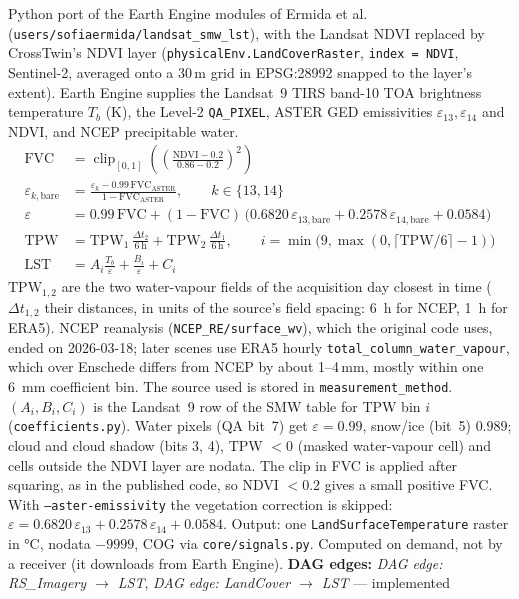 \documentclass[11pt]{article}
\newcommand{\code}[1]{\texttt{#1}}
\newcommand{\dagedge}[1]{\textit{DAG edge: #1}}
\newcommand{\statusdone}{\textcolor{green!50!black}{implemented}}
\begin{document}
Python port of the Earth Engine modules of Ermida et al.\ \cite{Ermida2020SMW} (\texttt{users/sofiaermida/landsat\_smw\_lst}), with the Landsat NDVI replaced by CrossTwin's NDVI layer (\code{physicalEnv.LandCoverRaster}, \code{index = NDVI}, Sentinel-2, averaged onto a 30\,m grid in EPSG:28992 snapped to the layer's extent). Earth Engine supplies the Landsat~9 TIRS band-10 TOA brightness temperature $T_b$ (\si{K}), the Level-2 \texttt{QA\_PIXEL}, ASTER GED emissivities $\varepsilon_{13}, \varepsilon_{14}$ and NDVI, and NCEP precipitable water.
\begin{align}
  \mathrm{FVC} &= \operatorname{clip}_{[0,1]}\!\left(\left(\frac{\mathrm{NDVI} - 0.2}{0.86 - 0.2}\right)^{2}\right) \\
  \varepsilon_{k,\text{bare}} &= \frac{\varepsilon_{k} - 0.99\,\mathrm{FVC}_{\text{ASTER}}}{1 - \mathrm{FVC}_{\text{ASTER}}}, \qquad k \in \{13, 14\} \\
  \varepsilon &= 0.99\,\mathrm{FVC} + (1 - \mathrm{FVC})\,\big(0.6820\,\varepsilon_{13,\text{bare}} + 0.2578\,\varepsilon_{14,\text{bare}} + 0.0584\big) \\
  \mathrm{TPW} &= \mathrm{TPW}_1\,\frac{\Delta t_2}{6\,\mathrm{h}} + \mathrm{TPW}_2\,\frac{\Delta t_1}{6\,\mathrm{h}}, \qquad i = \min\!\big(9, \max(0, \lceil \mathrm{TPW}/6 \rceil - 1)\big) \\
  \mathrm{LST} &= A_i \frac{T_b}{\varepsilon} + \frac{B_i}{\varepsilon} + C_i
\end{align}
$\mathrm{TPW}_{1,2}$ are the two water-vapour fields of the acquisition day closest in time ($\Delta t_{1,2}$ their distances, in units of the source's field spacing: \SI{6}{h} for NCEP, \SI{1}{h} for ERA5). NCEP reanalysis (\texttt{NCEP\_RE/surface\_wv}), which the original code uses, ended on 2026-03-18; later scenes use ERA5 hourly \texttt{total\_column\_water\_vapour}, which over Enschede differs from NCEP by about 1--4\,mm, mostly within one \SI{6}{mm} coefficient bin. The source used is stored in \code{measurement\_method}. $(A_i, B_i, C_i)$ is the Landsat~9 row of the SMW table for TPW bin $i$ (\code{coefficients.py}). Water pixels (QA bit~7) get $\varepsilon = 0.99$, snow/ice (bit~5) $0.989$; cloud and cloud shadow (bits 3, 4), TPW $<0$ (masked water-vapour cell) and cells outside the NDVI layer are nodata. The clip in FVC is applied after squaring, as in the published code, so NDVI $<0.2$ gives a small positive FVC. With \code{--aster-emissivity} the vegetation correction is skipped: $\varepsilon = 0.6820\,\varepsilon_{13} + 0.2578\,\varepsilon_{14} + 0.0584$. Output: one \code{LandSurfaceTemperature} raster in \si{\celsius}, nodata $-9999$, COG via \code{core/signals.py}. Computed on demand, not by a receiver (it downloads from Earth Engine). \textbf{DAG edges:} \dagedge{RS\_Imagery $\rightarrow$ LST}, \dagedge{LandCover $\rightarrow$ LST} --- \statusdone{}
\end{document}
